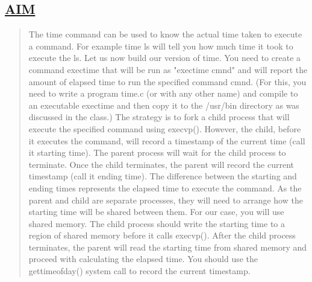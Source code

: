 \documentclass[a4paper, 12pt]{article}
\begin{document}
\subsection*{\underline{AIM}}
\begin{quote}
The time command can be used to know the actual time taken to execute a command. For example time ls will tell you how much time it took to execute the ls. Let us now build our version of time. You need to create a command exectime that will be run as "exectime cmnd" and will report the amount of elapsed time to run the specified command cmnd. (For this, you need to write a program time.c (or with any other name) and compile to an executable exectime and then copy it to the /usr/bin directory as was discussed in the class.) The strategy is to fork a child process that will execute the specified command using execvp(). However, the child, before it executes the command, will record a timestamp of the current time (call it starting time). The parent process will wait for the child process to terminate. Once the child terminates, the parent will record the current timestamp (call it ending time). The difference between the starting and ending times represents the elapsed time to execute the command. As the parent and child are separate processes, they will need to arrange how the starting time will be shared between them. For our case, you will use shared memory. The child process should write the starting time to a region of shared memory before it calls execvp(). After the child process terminates, the parent will read the starting time from shared memory and proceed with calculating the elapsed time. You should use the gettimeofday() system call to record the current timestamp.
\end{quote}
\end{document}

